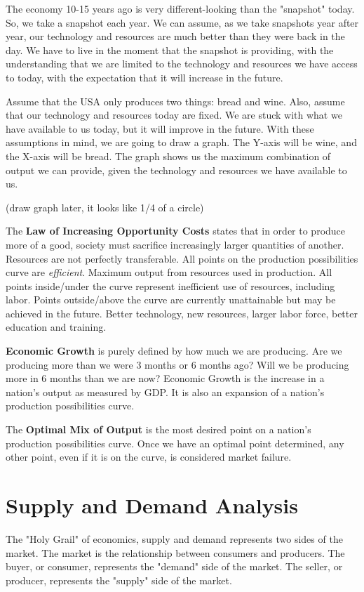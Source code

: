 \documentclass{article}
\begin{document}
    The economy 10-15 years ago is very different-looking than the "snapshot" today. So, we take a snapshot each year. We can assume, as we take snapshots year after year, our technology and resources are much better than they were back in the day. We have to live in the moment that the snapshot is providing, with the understanding that we are limited to the technology and resources we have access to today, with the expectation that it will increase in the future.
    
    Assume that the USA only produces two things: bread and wine. Also, assume that our technology and resources today are fixed. We are stuck with what we have available to us today, but it will improve in the future. With these assumptions in mind, we are going to draw a graph. The Y-axis will be wine, and the X-axis will be bread. The graph shows us the maximum combination of output we can provide, given the technology and resources we have available to us.

    (draw graph later, it looks like 1/4 of a circle)

    The \textbf{Law of Increasing Opportunity Costs} states that in order to produce more of a good, society must sacrifice increasingly larger quantities of another. Resources are not perfectly transferable. All points on the production possibilities curve are \textit{efficient}. Maximum output from resources used in production. All points inside/under the curve represent inefficient use of resources, including labor. Points outside/above the curve are currently unattainable but may be achieved in the future. Better technology, new resources, larger labor force, better education and training.

    \textbf{Economic Growth} is purely defined by how much we are producing. Are we producing more than we were 3 months or 6 months ago? Will we be producing more in 6 months than we are now? Economic Growth is the increase in a nation's output as measured by GDP. It is also an expansion of a nation's production possibilities curve.

    The \textbf{Optimal Mix of Output} is the most desired point on a nation's production possibilities curve. Once we have an optimal point determined, any other point, even if it is on the curve, is considered market failure.

\section{Supply and Demand Analysis}
The "Holy Grail" of economics, supply and demand represents two sides of the market. The market is the relationship between consumers and producers. The buyer, or consumer, represents the "demand" side of the market. The seller, or producer, represents the "supply" side of the market.
\end{document}
